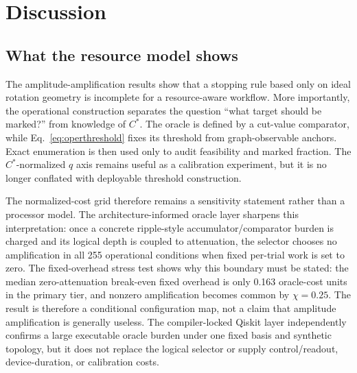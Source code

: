 \documentclass[5p,times]{elsarticle}
\begin{document}
\section{Discussion}
\subsection{What the resource model shows}
The amplitude-amplification results show that a stopping rule based only on ideal rotation geometry is incomplete for a resource-aware workflow. More importantly, the operational construction separates the question ``what target should be marked?'' from knowledge of $C^*$. The oracle is defined by a cut-value comparator, while Eq.~\eqref{eq:operthreshold} fixes its threshold from graph-observable anchors. Exact enumeration is then used only to audit feasibility and marked fraction. The $C^*$-normalized $q$ axis remains useful as a calibration experiment, but it is no longer conflated with deployable threshold construction.

The normalized-cost grid therefore remains a sensitivity statement rather than a processor model. The architecture-informed oracle layer sharpens this interpretation: once a concrete ripple-style accumulator/comparator burden is charged and its logical depth is coupled to attenuation, the selector chooses no amplification in all 255 operational conditions when fixed per-trial work is set to zero. The fixed-overhead stress test shows why this boundary must be stated: the median zero-attenuation break-even fixed overhead is only 0.163 oracle-cost units in the primary tier, and nonzero amplification becomes common by $\chi=0.25$. The result is therefore a conditional configuration map, not a claim that amplitude amplification is generally useless. The compiler-locked Qiskit layer independently confirms a large executable oracle burden under one fixed basis and synthetic topology, but it does not replace the logical selector or supply control/readout, device-duration, or calibration costs.
\end{document}
